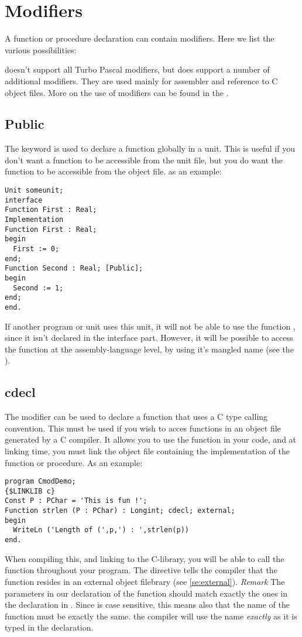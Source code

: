 \documentclass{report}
\begin{document}
\section{Modifiers}
A function or procedure declaration can contain modifiers. Here we list the
various possibilities:

\fpc doesn't support all Turbo Pascal modifiers, but
does support a number of additional modifiers. They are used mainly for assembler and
reference to C object files. More on the use of modifiers can be found in
the \progref.
\subsection{Public}
The  keyword is used to declare a function globally in a unit.
This is useful if you don't want a function to be accessible from the unit
file, but you do want the function to be accessible from the object file.
as an example:
\begin{verbatim}
Unit someunit;
interface
Function First : Real;
Implementation
Function First : Real;
begin
  First := 0;
end;
Function Second : Real; [Public];
begin
  Second := 1;
end;
end.
\end{verbatim}
If another program or unit uses this unit, it will not be able to use the
function , since it isn't declared in the interface part.
However, it will be possible to access the function  at the
assembly-language level, by using it's mangled name (see the \progref).
\subsection{cdecl}
\label{se:cdecl}
The  modifier can be used to declare a function that uses a C
type calling convention. This must be used if you wish to acces functions in
an object file generated by a C compiler. It allows you to use the function in
your code, and at linking time, you must link the object file containing the
 implementation of the function or procedure.
As an example:
\begin{verbatim}
program CmodDemo;
{$LINKLIB c}
Const P : PChar = 'This is fun !';
Function strlen (P : PChar) : Longint; cdecl; external;
begin
  WriteLn ('Length of (',p,') : ',strlen(p))
end.
\end{verbatim}
When compiling this, and linking to the C-library, you will be able to call
the  function throughout your program. The 
directive tells the compiler that the function resides in an external
object filebrary (see \ref{se:external}).
{\em Remark} The parameters in our declaration of the  function should
match exactly the ones in the declaration in . Since  is case
sensitive, this means also that the name of the
function must be exactly the same. the \fpc compiler will use the name {\em
exactly} as it is typed in the declaration.
\end{document}
